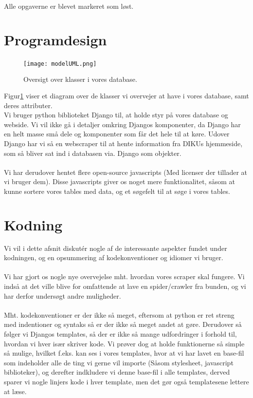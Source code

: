 \documentclass[11pt]{article}
\begin{document}
Alle opgaverne er blevet markeret som løst.

\section{Programdesign}
\begin{figure}[H]
	\centering
	\texttt{[image: modelUML.png]}
	\caption{Oversigt over klasser i vores database.}
	\label{fig:UML}
\end{figure}

Figur\ref{fig:UML} viser et diagram over de klasser vi overvejer at have i vores database, samt deres attributer. \\ 

Vi bruger python biblioteket Django til, at holde styr på vores database og webside. Vi vil ikke gå i detaljer omkring Djangos komponenter, da Django har en helt masse små dele og komponenter som får det hele til at køre. 
Udover Django har vi så en webscraper til at hente information fra DIKUs hjemmeside, som så bliver sat ind i databasen via. Django som objekter. \\ \\

Vi har derudover hentet flere open-source javascripts (Med licenser der tillader at vi bruger dem). Disse javascripts giver os noget mere funktionalitet, såsom at kunne sortere vores tables med data, og et søgefelt til at søge i vores tables.

\section{Kodning}
Vi vil i dette afsnit diskutér nogle af de interessante aspekter fundet under kodningen, og en opsummering af kodekonventioner og idiomer vi bruger. \\ \\
Vi har gjort os nogle nye overvejelse mht. hvordan vores scraper skal fungere. Vi indså at det ville blive for omfattende at lave en spider/crawler fra bunden, og vi har derfor undersøgt andre muligheder. \\ \\
Mht. kodekonventioner er der ikke så meget, eftersom at python er ret streng med indentioner og syntaks så er der ikke så meget andet at gøre. Derudover så følger vi Djangos templates, så der er ikke så mange udfordringer i forhold til, hvordan vi hver især skriver kode. Vi prøver dog at holde funktionerne så simple så mulige, hvilket f.eks. kan ses i vores templates, hvor at vi har lavet en base-fil som indeholder alle de ting vi gerne vil importe (Såsom stylesheet, javascript biblioteker), og derefter indkludere vi denne base-fil i alle templates, derved sparer vi nogle linjers kode i hver template, men det gør også templatesene lettere at læse.
\end{document}
